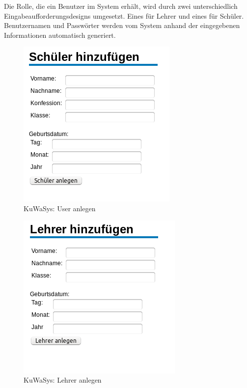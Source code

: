 Die Rolle, die ein Benutzer im System erhält, wird durch zwei unterschiedlich Eingabeaufforderungsdesigns umgesetzt. Eines für Lehrer und eines für Schüler. Benutzernamen und Passwörter werden vom System anhand der eingegebenen Informationen automatisch generiert. 

\begin{figure}[H]
 \begin{center}
   \includegraphics[scale=0.6]{img/UserAnlegen_KuWaSys.png}
 \end{center}
 \caption[\textbf{KuWaSys: User anlegen}]{KuWaSys: User anlegen}
 \label{fig:UserAnlegen_KuWaSys}
\end{figure}


\begin{figure}[H]
 \begin{center}
   \includegraphics[scale=0.6]{img/LehrerAnlegen_KuWaSys.png}
 \end{center}
 \caption[\textbf{KuWaSys: Lehrer anlegen}]{KuWaSys: Lehrer anlegen}
 \label{fig:LehrerAnlegen_KuWaSys}
\end{figure}

